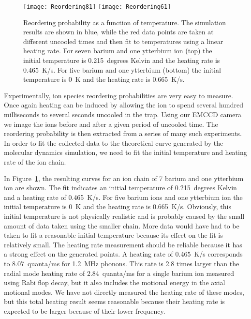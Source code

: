 \begin{figure}
	\centering
	\texttt{[image: Reordering81]}
	\texttt{[image: Reordering61]}
	\caption[Reordering probability of ion chains at different temperatures]{Reordering probability as a function of temperature.  The simulation results are shown in blue, while the red data points are taken at different uncooled times and then fit to temperatures using a linear heating rate.  For seven barium and one ytterbium ion (top) the initial temperature is 0.215~degrees Kelvin and the heating rate is 0.465~K/s.  For five barium and one ytterbium (bottom) the initial temperature is 0~K and the heating rate is 0.665~K/s.}
	\label{fig:reordering81}
\end{figure}

Experimentally, ion species reordering probabilities are very easy to measure.  Once again heating can be induced by allowing the ion to spend several hundred milliseconds to several seconds uncooled in the trap.  Using our EMCCD camera we image the ions before and after a given period of uncooled time.  The reordering probability is then extracted from a series of many such experiments.  In order to fit the collected data to the theoretical curve generated by the molecular dynamics simulation, we need to fit the initial temperature and heating rate of the ion chain.  

In Figure~\ref{fig:reordering81}, the resulting curves for an ion chain of 7 barium and one ytterbium ion are shown.  The fit indicates an initial temperature of 0.215~degrees Kelvin and a heating rate of 0.465~K/s.  For five barium ions and one ytterbium ion the initial temperature is 0~K and the heating rate is 0.665~K/s.  Obviously, this initial temperature is not physically realistic and is probably caused by the small amount of data taken using the smaller chain.  More data would have had to be taken to fit a reasonable initial temperature because its effect on the fit is relatively small.  The heating rate measurement should be reliable because it has a strong effect on the generated points.  A heating rate of 0.465~K/s corresponds to 8.07~quanta/ms for 1.2~MHz phonons.  This rate is 2.8 times larger than the radial mode heating rate of 2.84~quanta/ms for a single barium ion measured using Rabi flop decay, but it also includes the motional energy in the axial motional modes.  We have not directly measured the heating rate of these modes, but this total heating result seems reasonable because their heating rate is expected to be larger because of their lower frequency.

